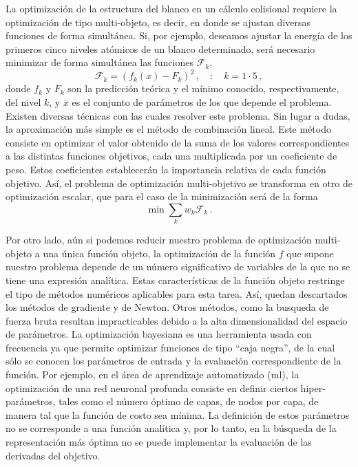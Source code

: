 La optimización de la estructura del blanco en un cálculo colisional 
requiere la optimización de tipo multi-objeto, es decir, en donde se 
ajustan diversas funciones de forma simultánea. Si, por ejemplo, deseamos 
ajustar la energía de los primeros cinco niveles atómicos de un blanco 
determinado, será necesario minimizar de forma simultánea las funciones 
$\mathcal{F}_k$, 
\begin{equation}
\mathcal{F}_k = (f_k(x)-F_k)^2\,,\quad:\quad k=1\cdot 5\,,
\end{equation}
donde $f_k$ y $F_k$ son la predicción teórica y el mínimo conocido, 
respectivamente, del nivel $k$, y $\bar{x}$ es el conjunto de parámetros 
de los que depende el problema. Existen diversas técnicas con las cuales 
resolver este problema. Sin lugar a dudas, la aproximación más simple es 
el método de combinación lineal. Este método consiste en optimizar el 
valor obtenido de la suma de los valores correspondientes a las distintas 
funciones objetivos, cada una multiplicada por un coeficiente de peso.
Estos coeficientes establecerán la importancia relativa de cada función 
objetivo. Así, el problema de optimización multi-objetivo se transforma 
en otro de optimización escalar, que para el caso de la minimización será 
de la forma
\begin{equation}
\min\sum_k w_k \mathcal{F}_k\,.
\end{equation}

Por otro lado, aún si podemos reducir nuestro problema de optimización 
multi-objeto a una única función objeto, la optimización de la función 
$f$ que supone nuestro problema depende de un número significativo de 
variables de la que no se tiene una expresión analítica. Estas 
características de la función objeto restringe el tipo de métodos 
numéricos aplicables para esta tarea. Así, quedan descartados los métodos 
de gradiente y de Newton. Otros métodos, como la busqueda de fuerza bruta 
resultan impracticables debido a la alta dimensionalidad del espacio de 
parámetros. La optimización bayesiana es una herramienta usada con 
frecuencia ya que permite optimizar funciones de tipo ``caja negra'', de 
la cual sólo se conocen los parámetros de entrada y la evaluación 
correspondiente de la función. Por ejemplo, en el área de aprendizaje 
automatizado (\acs{ml}), la optimización de una red neuronal profunda 
consiste en definir ciertos hiper-parámetros, tales como el número óptimo 
de capas, de nodos por capa, de manera tal que la función de costo sea 
mínima. La definición de estos parámetros no se corresponde a una función 
analítica y, por lo tanto, en la búsqueda de la representación más óptima 
no se puede implementar la evaluación de las derivadas del objetivo. 

